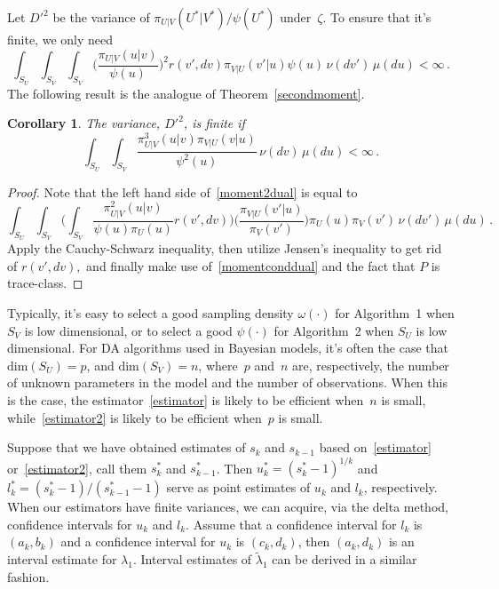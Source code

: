 \documentclass[11pt]{article}
\newtheorem{corollary}[theorem]{Corollary}
\begin{document}
	Let $D'^2$ be the variance of $\pi_{U|V}(U^*|V^*)/\psi(U^*)$ under~$\zeta$. To ensure that it's finite,
        we only need
	\begin{equation} \label{moment2dual} \int_{S_U} \int_{S_V}
          \int_{S_V} \bigg(\frac{\pi_{U|V}(u|v)}{\psi(u)}\bigg)^2
          r(v',dv) \pi_{V|U}(v'|u) \psi(u) \,\nu(dv') \, \mu(du) <
          \infty \,.
	\end{equation}
	The following result is the analogue of Theorem~\ref{secondmoment}.
	\begin{corollary} \label{secondmomentdual} The variance, $D'^2$, is finite if
          \begin{equation} \label{momentconddual} \int_{S_U}
            \int_{S_V} \frac{\pi_{U|V}^3(u|v) \pi_{V|U}(v|u)}
            {\psi^2(u)} \,\nu(dv) \, \mu(du) < \infty \,.
		\end{equation}
	\end{corollary}
	\begin{proof}
          Note that the left hand side of~\eqref{moment2dual} is equal
          to
		\[
		\int_{S_U} \int_{S_V} \bigg(\int_{S_V}
                \frac{\pi_{U|V}^2(u|v)}{\psi(u)\pi_U(u)} r(v',dv)
                \bigg) \bigg( \frac{\pi_{V|U}(v'|u)}{\pi_V(v')} \bigg)
                \pi_U(u)\pi_V(v') \,\nu(dv') \, \mu(du) \,.
		\]
		Apply the Cauchy-Schwarz inequality, then utilize
                Jensen's inequality to get rid of $r(v',dv),$ and
                finally make use of~\eqref{momentconddual} and the
                fact that $P$ is trace-class.
	\end{proof}
	
	
	Typically, it's easy to select a good sampling density $\omega(\cdot)$ for Algorithm~1 when $S_V$ is low dimensional, or to select a good $\psi(\cdot)$ for Algorithm~2 when $S_U$ is low dimensional.
	For DA algorithms used in Bayesian models, it's often the case that $\mbox{dim} (S_U) = p$, and $\mbox{dim} (S_V) = n$, where~$p$ and~$n$ are, respectively, the number of unknown parameters in the model and the number of observations.
	When this is the case, the estimator~\eqref{estimator} is likely to be efficient when~$n$ is small, while~\eqref{estimator2} is likely to be efficient when~$p$ is small. 
	
	
	Suppose that we have obtained estimates of $s_k$ and $s_{k-1}$ based on~\eqref{estimator} or~\eqref{estimator2}, call them $s^*_k$ and $s^*_{k-1}$. Then $u^*_k = (s^*_k-1)^{1/k}$ and $l^*_k = (s^*_k-1)/(s^*_{k-1}-1)$ serve as point estimates of $u_k$ and $l_k$, respectively. When our estimators have finite variances, we can acquire, via the delta method, confidence intervals for $u_k$ and $l_k$. Assume that a confidence interval for $l_k$ is $(a_k,b_k)$ and a confidence interval for $u_k$ is $(c_k, d_k)$, then $(a_k, d_k)$ is an interval estimate for $\lambda_1$. Interval estimates of $\tilde{\lambda}_1$ can be derived in a similar fashion.
	
\end{document}

